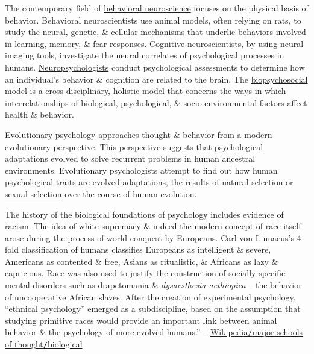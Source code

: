\documentclass[oneside]{book}
\numberwithin{equation}{section}
\begin{document}
The contemporary field of \href{https://en.wikipedia.org/wiki/Behavioral_neuroscience}{behavioral neuroscience} focuses on the physical basis of behavior. Behavioral neuroscientists use animal models, often relying on rats, to study the neural, genetic, \& cellular mechanisms that underlie behaviors involved in learning, memory, \& fear responses. \href{https://en.wikipedia.org/wiki/Cognitive_neuroscience}{Cognitive neuroscientists}, by using neural imaging tools, investigate the neural correlates of psychological processes in humans. \href{https://en.wikipedia.org/wiki/Neuropsychology}{Neuropsychologists} conduct psychological assessments to determine how an individual's behavior \& cognition are related to the brain. The \href{https://en.wikipedia.org/wiki/Biopsychosocial_model}{biopsychosocial model} is a cross-disciplinary, holistic model that concerns the ways in which interrelationships of biological, psychological, \& socio-environmental factors affect health \& behavior.

\href{https://en.wikipedia.org/wiki/Evolutionary_psychology}{Evolutionary psychology} approaches thought \& behavior from a modern \href{https://en.wikipedia.org/wiki/Evolution}{evolutionary} perspective. This perspective suggests that psychological adaptations evolved to solve recurrent problems in human ancestral environments. Evolutionary psychologists attempt to find out how human psychological traits are evolved adaptations, the results of \href{https://en.wikipedia.org/wiki/Natural_selection}{natural selection} or \href{https://en.wikipedia.org/wiki/Sexual_selection}{sexual selection} over the course of human evolution.

The history of the biological foundations of psychology includes evidence of racism. The idea of white supremacy \& indeed the modern concept of race itself arose during the process of world conquest by Europeans. \href{https://en.wikipedia.org/wiki/Carl_von_Linnaeus}{Carl von Linnaeus}'s 4-fold classification of humans classifies Europeans as intelligent \& severe, Americans as contented \& free, Asians as ritualistic, \& Africans as lazy \& capricious. Race was also used to justify the construction of socially specific mental disorders such as \href{https://en.wikipedia.org/wiki/Drapetomania}{drapetomania} \& \href{https://en.wikipedia.org/wiki/Dysaesthesia_aethiopica}{\textit{dysaesthesia aethiopica}} -- the behavior of uncooperative African slaves. After the creation of experimental psychology, ``ethnical psychology'' emerged as a subdiscipline, based on the assumption that studying primitive races would provide an important link between animal behavior \& the psychology of more evolved humans.'' -- \href{https://en.wikipedia.org/wiki/Psychology#Biological}{Wikipedia\texttt{/}major schools of thought\texttt{/}biological}
\end{document}
